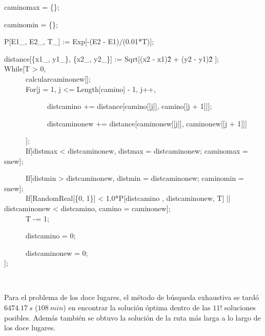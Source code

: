 \documentclass[11pt, table]{report}
\begin{document}
{{caminomax = \{\};

caminomin = \{\};

P[E1\_, E2\_, T\_] := Exp[-(E2 - E1)/(0.01*T)];

distance[\{x1\_, y1\_\}, \{x2\_, y2\_\}] := Sqrt[(x2 - x1)\^2 + (y2 - y1)\^2 ];\\


While[T > 0,\\

\ \ \ \ \ \ calcularcaminonew[];\\

\ \ \ \ \ \ For[j = 1, j <= Length[camino] - 1, j++,

\ \ \ \ \ \ \ \ \ \ \ \ distcamino += distance[camino[[j]], camino[[j + 1]]];
  
\ \ \ \ \ \ \ \ \ \ \ \ distcaminonew += distance[caminonew[[j]], caminonew[[j + 1]]]
  
\ \ \ \ \ \ ];\\

\ \ \ \ \ \ If[distmax < distcaminonew, distmax = distcaminonew; caminomax = snew];

\ \ \ \ \ \ If[distmin > distcaminonew, distmin = distcaminonew; caminomin = snew];\\

\ \ \ \ \ \ If[RandomReal[\{0, 1\}] < 1.0*P[distcamino , distcaminonew, T] || distcaminonew < distcamino, camino = caminonew];\\

\ \ \ \ \ \ T -= 1;

\ \ \ \ \ \ distcamino = 0;

\ \ \ \ \ \ distcaminonew = 0;\\

];


}

\

\pagebreak

Para el problema de los doce lugares, el método de búsqueda exhaustiva se tardó $6474.17\ s$ ($108\ min$) en encontrar la solución óptima dentro de las $11!$ soluciones posibles. Además también se obtuvo la solución de la ruta más larga a lo largo de los doce lugares.

\vspace{0.5cm}

}
\end{document}
